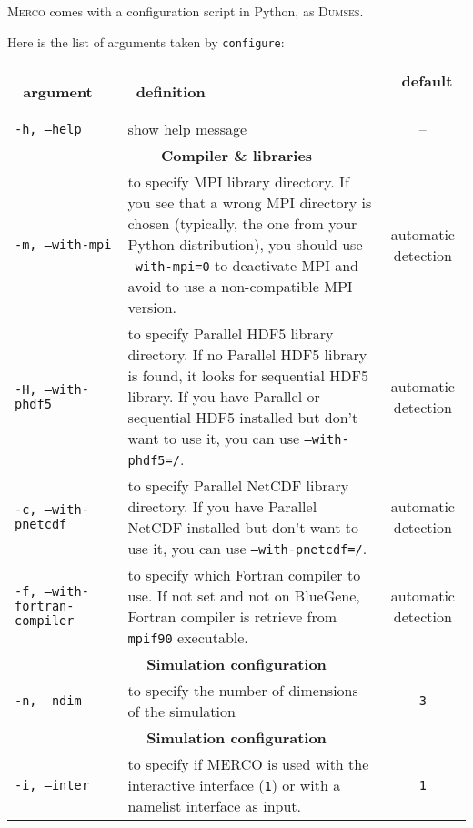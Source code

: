 \documentclass[a4paper,12pt]{article}
\begin{document}
\textsc{Merco} comes with a configuration script in Python, as \textsc{Dumses}.

Here is the list of arguments taken by \texttt{configure}:
\clearpage
\begin{table}[h!]
  \centering
  {\footnotesize
    \begin{tabular}{l | p{} | c }
      ~\hfill argument\hfill~ & ~\hfill definition\hfill~ & ~\hfill default \hfill~ \\
      \hline
      \hline
      \texttt{-h, --help} & show help message & -- \\
      \hline
      \multicolumn{3}{c}{\normalsize \bfseries Compiler \& libraries} \\
      \hline
      \texttt{-m, --with-mpi} & to specify MPI library directory. If you see that a wrong MPI directory is chosen (typically, the one from your Python distribution), you should use \texttt{--with-mpi=0} to deactivate MPI and avoid to use a non-compatible MPI version. & automatic detection \\
      \texttt{-H, --with-phdf5} & to specify Parallel HDF5 library directory. If no Parallel HDF5 library is found, it looks for sequential HDF5 library. If you have Parallel or sequential HDF5 installed but don't want to use it, you can use \texttt{--with-phdf5=/}. & automatic detection \\
      \texttt{-c, --with-pnetcdf} & to specify Parallel NetCDF library directory. If you have Parallel NetCDF installed but don't want to use it, you can use \texttt{--with-pnetcdf=/}. & automatic detection \\
      \texttt{-f, --with-fortran-compiler} & to specify which Fortran compiler to use. If not set and not on BlueGene, Fortran compiler is retrieve from \texttt{mpif90} executable. & automatic detection \\
      \hline
      \multicolumn{3}{c}{\normalsize \bfseries Simulation configuration} \\
      \hline
      \texttt{-n, --ndim} & to specify the number of dimensions of the simulation & \texttt{3} \\
      \hline
      \multicolumn{3}{c}{\normalsize \bfseries Simulation configuration} \\
      \hline
      \texttt{-i, --inter} & to specify if MERCO is used with the interactive interface (\texttt{1}) or with a namelist interface as input. & \texttt{1} \\
      \hline
    \end{tabular}
  }
\end{table}
\end{document}
